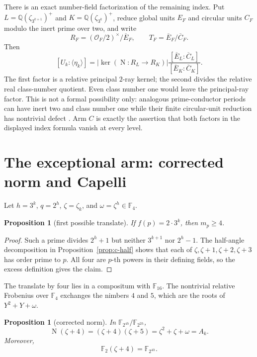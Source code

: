 \documentclass[11pt]{article}
\newtheorem{proposition}[theorem]{Proposition}
\theoremstyle{definition}
\theoremstyle{remark}
\begin{document}
There is an exact number-field factorization of the remaining index.  Put
$L=\mathbb Q(\zeta_{3^{k+1}})^+$ and
$K=\mathbb Q(\zeta_{3^k})^+$, reduce global units $E_F$ and circular units
$C_F$ modulo the inert prime over two, and write
\[
 R_F=(\mathcal O_F/2)^{\times}/\overline E_F,
 \qquad T_F=\overline E_F/\overline C_F.
\]
Then
\[
 [U_k:\langle\eta_k\rangle]
 =|\ker(\operatorname N:R_L\to R_K)|
  \frac{[\overline E_L:\overline C_L]}
       {[\overline E_K:\overline C_K]}.
\]
The first factor is a relative principal $2$-ray kernel; the second divides
the relative real class-number quotient.  Even class number one would leave
the principal-ray factor.  This is not a formal possibility only: analogous
prime-conductor periods can have inert two and class number one while their
finite circular-unit reduction has nontrivial defect
\cite{hoechsmann1995}.  Arm $C$ is exactly the assertion that both factors
in the displayed index formula vanish at every level.

\section{The exceptional arm: corrected norm and Capelli}\label{sec:d}

Let $h=3^k$, $q=2^h$, $\zeta=\zeta_k$, and
$\omega=\zeta^h\in\mathbb F_4$.

\begin{proposition}[first possible translate]\label{prop:d-lower}
If $f(p)=2\cdot3^k$, then $m_p\geq4$.
\end{proposition}

\begin{proof}
Such a prime divides $2^h+1$ but neither $3^{k+1}$ nor $2^h-1$.  The
half-angle decomposition in Proposition~\ref{prop:c-half} shows that each of
$\zeta,\zeta+1,\zeta+2,\zeta+3$ has order prime to $p$.  All four are
$p$-th powers in their defining fields, so the excess definition gives the
claim.
\end{proof}

The translate by four lies in a compositum with $\mathbb F_{16}$.  The
nontrivial relative Frobenius over $\mathbb F_4$ exchanges the nimbers $4$
and $5$, which are the roots of $Y^2+Y+\omega$.

\begin{proposition}[corrected norm]\label{prop:d-norm}
In $\mathbb F_{2^{4h}}/\mathbb F_{2^{2h}}$,
\[
 \operatorname N(\zeta+4)
 = (\zeta+4)(\zeta+5)
 = \zeta^2+\zeta+\omega=A_k.
\]
Moreover,
\[
 \mathbb F_2(\zeta+4)=\mathbb F_{2^{4h}}.
\]
\end{proposition}
\end{document}
